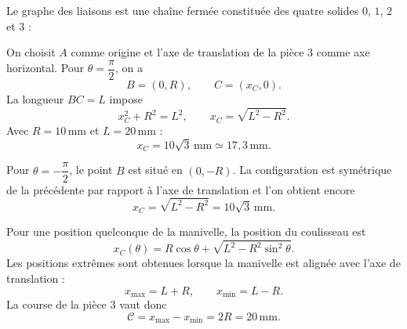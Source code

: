 \begin{corrigebox}

Le graphe des liaisons est une chaîne fermée constituée des quatre solides
$0$, $1$, $2$ et $3$ :
\begin{center}
\end{center}

On choisit $A$ comme origine et l'axe de translation de la pièce $3$ comme
axe horizontal. Pour $\theta=\dfrac{\pi}{2}$, on a
\[
B=(0,R),\qquad C=(x_C,0).
\]
La longueur $BC=L$ impose
\[
x_C^2+R^2=L^2,
\qquad
x_C=\sqrt{L^2-R^2}.
\]
Avec $R=10\,\mathrm{mm}$ et $L=20\,\mathrm{mm}$ :
\[
x_C=10\sqrt{3}\,\mathrm{mm}\simeq17{,}3\,\mathrm{mm}.
\]

Pour $\theta=-\dfrac{\pi}{2}$, le point $B$ est situé en $(0,-R)$.
La configuration est symétrique de la précédente par rapport à l'axe de
translation et l'on obtient encore
\[
x_C=\sqrt{L^2-R^2}=10\sqrt{3}\,\mathrm{mm}.
\]

Pour une position quelconque de la manivelle, la position du coulisseau est
\[
x_C(\theta)=R\cos\theta+
\sqrt{L^2-R^2\sin^2\theta}.
\]
Les positions extrêmes sont obtenues lorsque la manivelle est alignée avec
l'axe de translation :
\[
x_{\max}=L+R,
\qquad
x_{\min}=L-R.
\]
La course de la pièce $3$ vaut donc
\[
\mathcal{C}=x_{\max}-x_{\min}=2R=20\,\mathrm{mm}.
\]

\end{corrigebox}
